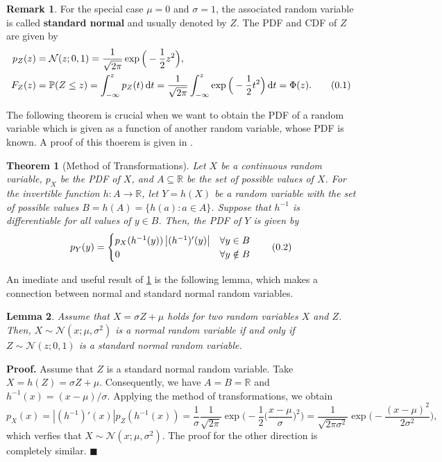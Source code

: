 \documentclass[10pt]{article}
\newtheorem{thm}{Theorem}[section]
\newtheorem{lem}[thm]{Lemma}
\theoremstyle{definition}
\newtheorem*{rem}{Remark}
\newenvironment{prf}{\noindent\textbf{Proof.}}{\hfill$\blacksquare$}
\newcommand\eqnum{\addtocounter{equation}{1}\tag{\arabic{section}.\arabic{equation}}}
\DeclareMathOperator{\df}{d\!}
\begin{document}
\begin{rem}
For the special case $\mu = 0$ and $\sigma = 1$, the associated random variable is called \textbf{standard normal} and usually denoted by $Z$. The PDF and CDF of $Z$ are given by
\begin{align*}
p_{Z}(z) &= \mathcal{N}(z; 0, 1) = \frac{1}{\sqrt{2\pi}}\exp\Big(-\frac{1}{2}z^2\Big), \\
F_Z(z) &= \mathbb{P}(Z\leq z) = \int_{-\infty}^{z}p_Z(t)\df t = 
\frac{1}{\sqrt{2\pi}}\int_{-\infty}^{z}\exp\Big(-\frac{1}{2}t^2\Big)\df t = \Phi(z).
\eqnum
\end{align*}
\end{rem}
The following theorem is crucial when we want to obtain the PDF of a random variable which is given as a function of another random variable, whose PDF is known. A proof of this thoerem is given in \cite{Gharamani2019}.
\begin{thm}[Method of Transformations]\label{thm:MT}
Let $X$ be a continuous random variable, $p_X$ be the PDF of $X$, and $A\subseteq\mathbb{R}$ be the set of possible values of $X$. For the invertible function $h:A\to\mathbb{R}$, let $Y=h(X)$ be a random variable with the set of possible values $B=h(A)=\{h(a): a\in A\}$. Suppose that $h^{-1}$ is differentiable for all values of $y\in B$. Then, the PDF of $Y$  is given by
\begin{equation*}
p_Y(y) = 
\begin{cases}
p_X(h^{-1}(y))\left|(h^{-1})'(y)\right| & \forall y \in B  \\
0 & \forall y \notin B 
\end{cases}
\eqnum
\end{equation*}
\end{thm}
\noindent
An imediate and useful result of \cref{thm:MT} is the following lemma, which makes a connection between normal and standard normal random variables.
\begin{lem}
Assume that $X=\sigma Z + \mu$ holds for two random variables $X$ and $Z$. Then, $X\sim\mathcal{N}(x; \mu, \sigma^2)$ is a normal random variable if and only if $Z\sim\mathcal{N}(z; 0, 1)$  is a standard normal random variable.
\end{lem}
\begin{prf}
Assume that $Z$ is a standard normal random variable. Take $X=h(Z)=\sigma Z + \mu$. Consequently, we have $A=B=\mathbb{R}$ and $h^{-1}(x)=(x-\mu)/\sigma$. Applying the method of transformations, we obtain
\begin{equation*}
p_X(x)=|(h^{-1})'(x)|p_Z(h^{-1}(x))
=\frac{1}{\sigma}\frac{1}{\sqrt{2\pi}}\exp\Big(-\frac{1}{2}\Big(\frac{x-\mu}{\sigma}\Big)^2\Big)
=\frac{1}{\sqrt{2\pi\sigma^2}}\exp\Big(-\frac{(x-\mu)^2}{2\sigma^2}\Big),
\end{equation*}
which verfies that  $X\sim\mathcal{N}(x; \mu, \sigma^2)$. The proof for the other direction is completely similar.
\end{prf}
\end{document}
